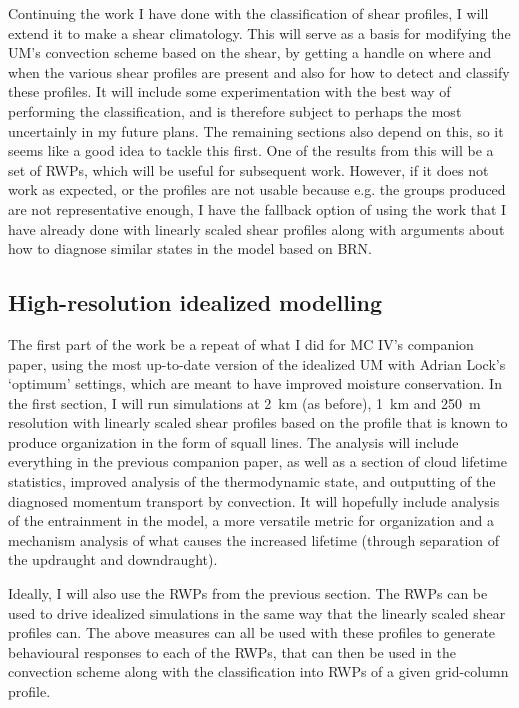 \documentclass[11pt,a4paper]{article}
\begin{document}
Continuing the work I have done with the classification of shear profiles, I will extend it to make a shear climatology. This will serve as a basis for modifying the UM's convection scheme based on the shear, by getting a handle on where and  when the various shear profiles are present and also for how to detect and classify these profiles. It will include some experimentation with the best way of performing the classification, and is therefore subject to perhaps the most uncertainly in my future plans. The remaining sections also depend on this, so it seems like a good idea to tackle this first. One of the results from this will be a set of RWPs, which will be useful for subsequent work. However, if it does not work as expected, or the profiles are not usable because e.g. the groups produced are not representative enough, I have the fallback option of using the work that I have already done with linearly scaled shear profiles along with arguments about how to diagnose similar states in the model based on BRN.

\subsection{High-resolution idealized modelling}
\label{sec:High-resolution idealized modelling}

The first part of the work be a repeat of what I did for MC IV's companion paper, using the most up-to-date version of the idealized UM with Adrian Lock's `optimum' settings, which are meant to have improved moisture conservation. In the first section, I will run simulations at \SI{2}{km} (as before), \SI{1}{km} and \SI{250}{m} resolution with linearly scaled shear profiles based on the profile that is known to produce organization in the form of squall lines. The analysis will include everything in the previous companion paper, as well as a section of cloud lifetime statistics, improved analysis of the thermodynamic state, and outputting of the diagnosed momentum transport by convection. It will hopefully include analysis of the entrainment in the model, a more versatile metric for organization and a mechanism analysis of what causes the increased lifetime (through separation of the updraught and downdraught).

Ideally, I will also use the RWPs from the previous section. The RWPs can be used to drive idealized simulations in the same way that the linearly scaled shear profiles can. The above measures can all be used with these profiles to generate behavioural responses to each of the RWPs, that can then be used in the convection scheme along with the classification into RWPs of a given grid-column profile.
\end{document}
